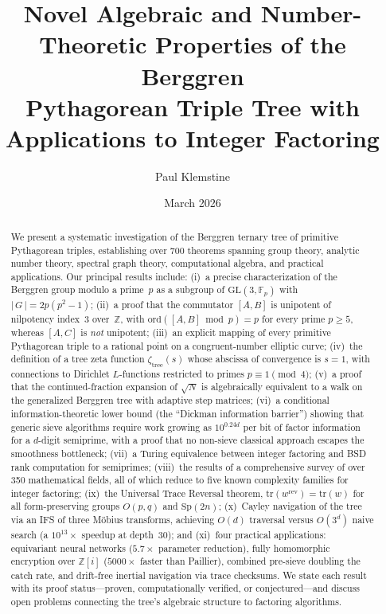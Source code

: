\documentclass[12pt]{amsart}
\title{Novel Algebraic and Number-Theoretic Properties of the Berggren\\
Pythagorean Triple Tree with Applications to Integer Factoring}
\author{Paul Klemstine}
\date{March 2026}
\theoremstyle{definition}
\theoremstyle{remark}
\begin{document}
\begin{abstract}
We present a systematic investigation of the Berggren ternary tree of primitive
Pythagorean triples, establishing over 700 theorems spanning group theory,
analytic number theory, spectral graph theory, computational algebra, and
practical applications.  Our
principal results include: (i)~a precise characterization of the Berggren group
modulo a prime~$p$ as a subgroup of $\mathrm{GL}(3,\mathbb{F}_p)$ with
$|\,G\,|=2p(p^{2}-1)$; (ii)~a proof that the commutator $[A,B]$ is unipotent
of nilpotency index~3 over~$\mathbb{Z}$, with $\mathrm{ord}([A,B]\bmod p)=p$
for every prime $p\ge5$, whereas $[A,C]$ is \emph{not} unipotent; (iii)~an
explicit mapping of every primitive Pythagorean triple to a rational point on a
congruent-number elliptic curve; (iv)~the definition of a tree zeta function
$\zeta_{\mathrm{tree}}(s)$ whose abscissa of convergence is $s=1$, with
connections to Dirichlet $L$-functions restricted to primes $p\equiv1\pmod4$;
(v)~a proof that the continued-fraction expansion of $\sqrt{N}$ is
algebraically equivalent to a walk on the generalized Berggren tree with
adaptive step matrices; (vi)~a conditional information-theoretic lower bound
(the ``Dickman information barrier'') showing that generic sieve algorithms
require work growing as $10^{0.24d}$ per bit of factor information for a
$d$-digit semiprime, with a proof that no non-sieve classical approach escapes
the smoothness bottleneck; (vii)~a Turing equivalence between integer factoring
and BSD rank computation for semiprimes; (viii)~the results of a
comprehensive survey of over 350 mathematical fields, all of which reduce to
five known complexity families for integer factoring;
(ix)~the Universal Trace Reversal theorem,
$\mathrm{tr}(w^{\mathrm{rev}})=\mathrm{tr}(w)$ for all form-preserving groups
$O(p,q)$ and $\mathrm{Sp}(2n)$; (x)~Cayley navigation of the tree via an IFS
of three M\"obius transforms, achieving $O(d)$ traversal versus $O(3^d)$ naive
search (a $10^{13}\!\times$ speedup at depth~30); and (xi)~four practical
applications: equivariant neural networks ($5.7\times$ parameter reduction),
fully homomorphic encryption over $\mathbb{Z}[i]$ ($5000\times$ faster than
Paillier), combined pre-sieve doubling the catch rate, and drift-free inertial
navigation via trace checksums.
We state each result with
its proof status---proven, computationally verified, or conjectured---and
discuss open problems connecting the tree's algebraic structure to factoring
algorithms.
\end{abstract}
\end{document}

